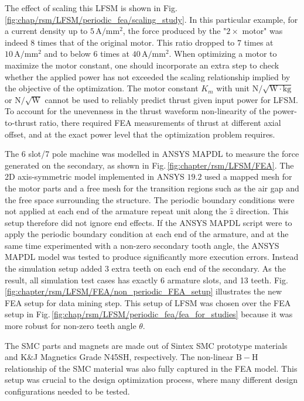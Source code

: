     
            The effect of scaling this \acs{LFSM} is shown in Fig.\,\ref{fig:chap/rsm/LFSM/periodic_fea/scaling_study}. In this particular example, for a current density up to $5\,\mathrm{A/ mm^2}$, the force produced by the "$2\times$ motor" was indeed $8$ times that of the original motor. This ratio dropped to $7$ times at $10\,\mathrm{A/ mm^2}$ and to below $6$ times at $40\,\mathrm{A/ mm^2}$. When optimizing a motor to maximize the motor constant, one should incorporate an extra step to check whether the applied power has not exceeded the scaling relationship implied by the objective of the optimization. The motor constant $K_m$ with unit $\mathrm{N/\sqrt{W\cdot kg}}$ or $\mathrm{N/\sqrt{W}}$ cannot be used to reliably predict thrust given input power for \acs{LFSM}. To account for the unevenness in the thrust waveform non-linearity of the power-to-thrust ratio, there required \acs{FEA} measurements of thrust at different axial offset, and at the exact power level that the optimization problem requires.
            

            The 6 slot/7 pole machine was modelled in ANSYS MAPDL to measure the force generated on the secondary, as shown in Fig.\,\ref{fig:chapter/rsm/LFSM/FEA}. The 2D axis-symmetric model implemented in ANSYS  $19.2$ used a mapped mesh for the motor parts and a free mesh for the transition regions such as the air gap and the free space surrounding the structure. The periodic boundary conditions were not applied at each end of the armature repeat unit along the $\hat{z}$ direction. This setup therefore did not ignore end effects. If the ANSYS MAPDL script were to apply the periodic boundary condition at each end of the armature, and at the same time experimented with a non-zero secondary tooth angle, the ANSYS MAPDL model was tested to produce significantly more execution errors. Instead the simulation setup added 3 extra teeth on each end of the secondary. As the result, all simulation test cases has exactly 6 armature slots, and 13 teeth. Fig.\,\ref{fig:chapter/rsm/LFSM/FEA/non_periodic_FEA_setup} illustrates the new \acs{FEA} setup for data mining step. This setup of \acs{LFSM} was chosen over the \acs{FEA} setup in Fig.\,\ref{fig:chap/rsm/LFSM/periodic_fea/fea_for_studies} because it was more robust for non-zero teeth angle $\theta$.
            

            The \acs{SMC} parts and magnets are made out of Sintex \acs{SMC} prototype materials and K$\&$J Magnetics Grade N45SH, respectively. The non-linear $\mathrm{B-H}$ relationship of the \acs{SMC} material was also fully captured in the FEA model. This setup was crucial to the design optimization process, where many different design configurations needed to be tested.
            
